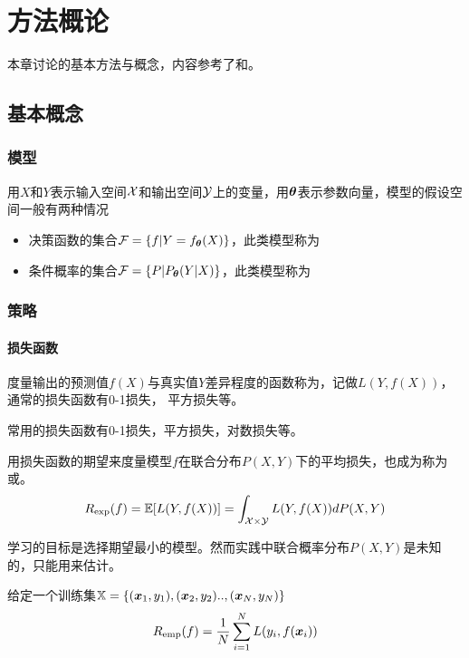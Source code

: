 \chapter{方法概论}
\label{chap:methodology}

本章讨论的基本方法与概念，内容参考了\cite{lihang2012StatLearningMethod}和\cite{MITMLMath}。

\section{基本概念}


\subsection{模型}
用$X$和$Y$表示输入空间${\mathcal{X}}$和输出空间${\mathcal{Y}}$上的变量，用${\bm{\theta}}$表示参数向量，模型的假设空间一般有两种情况
\begin{itemize}
	\item 决策函数的集合${\mathcal{F}}=\{f |Y=f_{{\bm{\theta}}}(X) \}$，此类模型称为
	\item 条件概率的集合${\mathcal{F}}=\{P|P_{{\bm{\theta}}}(Y|X) \}$，此类模型称为
\end{itemize}

\subsection{策略}


\subsubsection{损失函数}

度量输出的预测值$f(X)$与真实值$Y$差异程度的函数称为，记做$L(Y,f(X))$，通常的损失函数有0-1损失， 平方损失等。

常用的损失函数有0-1损失，平方损失，对数损失等。

用损失函数的期望来度量模型$f$在联合分布$P(X,Y)$下的平均损失，也成为称为或。
\[
	R_{\exp}(f) = \mathbb{E} [ L(Y,f(X)) ] = \int_{{\mathcal{X}} \times {\mathcal{Y}}} L(Y,f(X)) d P(X,Y)
	\nonumber
\]

学习的目标是选择期望最小的模型。然而实践中联合概率分布$P(X,Y)$是未知的，只能用来估计。

给定一个训练集${\mathbb{X}}=\{({\bm{x}}_1, y_1),({\bm{x}}_2, y_2)..,({\bm{x}}_N,y_N)  \}$
\[
	R_{\operatorname{emp}}(f) = \frac{1}{N} \sum_{i=1}^N L(y_i,f({\bm{x}}_i))	
	\nonumber
\]

